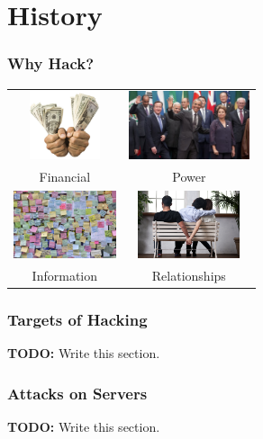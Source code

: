 \documentclass[10pt]{beamer}
\begin{document}
  \section[History]{History}
  \begin{frame}
    \frametitle{Why Hack?}
    \centering
    \begin{tabular}{c c}
      \includegraphics[height=2cm,keepaspectratio]{money.jpg}     &
      \includegraphics[height=2cm,keepaspectratio]{leaders.jpg}  \\
      Financial                                                   &
      Power                                                      \\
      \includegraphics[height=2cm,keepaspectratio]{info.jpg}      &
      \includegraphics[height=2cm,keepaspectratio]{cheating.jpg} \\
      Information                                                 &
      Relationships                                              \\
    \end{tabular}
  \end{frame}
  \begin{frame}
    \frametitle{Targets of Hacking}
    \textbf{TODO:} Write this section.
  \end{frame}
  \begin{frame}
    \frametitle{Attacks on Servers}
    \textbf{TODO:} Write this section.
  \end{frame}
\end{document}
